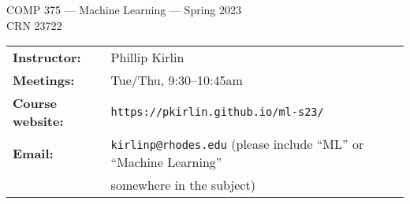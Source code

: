 \documentclass [letterpaper,11pt]{article}
\begin{document}
\begin{center}
\Large COMP 375 --- Machine Learning --- Spring 2023
\\ \normalsize CRN 23722
\end{center}

\noindent\begin{tabular}{@{}ll}
\textbf{Instructor:} & Phillip Kirlin \\
\textbf{Meetings:} & Tue/Thu, 9:30--10:45am \\
\textbf{Course website:} & \texttt{https://pkirlin.github.io/ml-s23/} \\
\textbf{Email:} & \texttt{kirlinp@rhodes.edu} (please include ``ML'' or ``Machine Learning''\\
\phantom{\textbf{Email:}} & somewhere in the subject)\\
\end{tabular}
\end{document}
